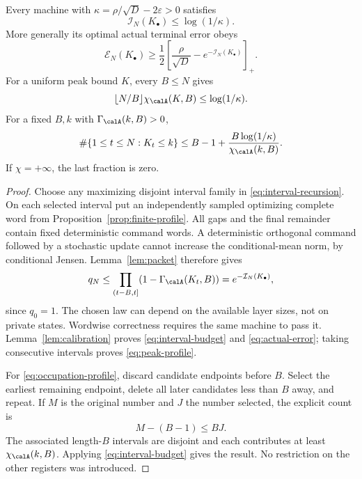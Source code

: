 \begin{theorem}\label{thm:profile}
Every machine with $\kappa=\rho/\sqrt D-2\varepsilon>0$ satisfies
\begin{equation}\label{eq:interval-budget}
                 \mathcal I_N(K_\bullet)\le\log(1/\kappa).
\end{equation}
More generally its optimal actual terminal error obeys
\begin{equation}\label{eq:actual-error}
 \mathcal E_N(K_\bullet)\ge
       \frac12\left[\frac\rho{\sqrt D}-e^{-\mathcal I_N(K_\bullet)}\right]_+.
\end{equation}
For a uniform peak bound $K$, every $B\le N$ gives
\begin{equation}\label{eq:peak-profile}
 \lfloor N/B\rfloor\chi_{\calA}(K,B)\le\log(1/\kappa).
\end{equation}
For a fixed $B,k$ with $\Gamma_{\calA}(k,B)>0$,
\begin{equation}\label{eq:occupation-profile}
 \#\{1\le t\le N:K_t\le k\}
 \le B-1+\frac{B\log(1/\kappa)}{\chi_{\calA}(k,B)}.
\end{equation}
If $\chi=+\infty$, the last fraction is zero.
\end{theorem}
\begin{proof}
Choose any maximizing disjoint interval family in \eqref{eq:interval-recursion}. On each selected interval put an independently sampled optimizing complete word from Proposition~\ref{prop:finite-profile}. All gaps and the final remainder contain fixed deterministic command words. A deterministic orthogonal command followed by a stochastic update cannot increase the conditional-mean norm, by conditional Jensen. Lemma~\ref{lem:packet} therefore gives
\[
 q_N\le\prod_{(t-B,t]}(1-\Gamma_{\calA}(K_t,B))
                         =e^{-\mathcal I_N(K_\bullet)},
\]
since $q_0=1$. The chosen law can depend on the available layer sizes, not on private states. Wordwise correctness requires the same machine to pass it. Lemma~\ref{lem:calibration} proves \eqref{eq:interval-budget} and \eqref{eq:actual-error}; taking consecutive intervals proves \eqref{eq:peak-profile}.

For \eqref{eq:occupation-profile}, discard candidate endpoints before $B$. Select the earliest remaining endpoint, delete all later candidates less than $B$ away, and repeat. If $M$ is the original number and $J$ the number selected, the explicit count is
\[
                         M-(B-1)\le BJ.
\]
The associated length-$B$ intervals are disjoint and each contributes at least $\chi_{\calA}(k,B)$. Applying \eqref{eq:interval-budget} gives the result. No restriction on the other registers was introduced.
\end{proof}

